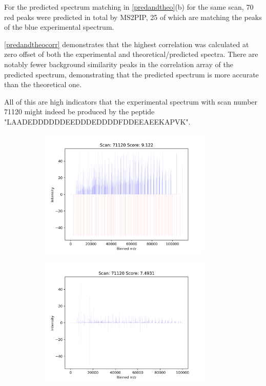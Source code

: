 \documentclass[11pt]{article}
\begin{document}
For the predicted spectrum matching in \cref{predandtheo}(b) for the same scan, 70 red peaks were predicted in total by MS2PIP, 25 of which are matching the peaks of the blue experimental spectrum.

\cref{predandtheocorr} demonstrates that the highest correlation was calculated at zero offset of both the experimental and theoretical/predicted spectra. There are notably fewer background similarity peaks in the correlation array of the predicted spectrum, demonstrating that the predicted spectrum is more accurate than the theoretical one.

All of this are high indicators that the experimental spectrum with scan number 71120 might indeed be produced by the peptide "LAADEDDDDDDEEDDDEDDDDFDDEEAEEKAPVK".


\begin{figure}
\centering
\begin{subfigure}[b]{1\textwidth}
    \includegraphics[width=0.9\textwidth]{figs/scan_71120_ps=False.png}
   \caption{}
   \label{fig:theo} 
\end{subfigure}
\begin{subfigure}[b]{1\textwidth}
   \includegraphics[width=0.9\textwidth]{figs/scan_71120_ps=True.png}

\end{subfigure}
\end{figure}
\end{document}
